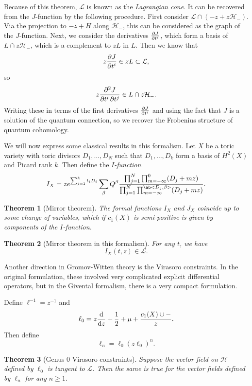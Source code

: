 \documentclass[leqno, openany]{memoir}
\newtheorem{thm}{Theorem}[section]
\theoremstyle{definition}
\theoremstyle{remark}
\theoremstyle{plain}
\theoremstyle{definition}
\theoremstyle{remark}
\newcommand{\mc}[1]{\mathcal{#1}}
\begin{document}
Because of this theorem, $\mc{L}$ is known as the \textit{Lagrangian cone}. It can be recovered from the $J$-function by the following procedure. First consider $\mc{L} \cap (-z + z \mc{H}_-)$. Via the projection to $-z + H$ along $\mc{H}_-$, this can be considered as the graph of the $J$-function. Next, we consider the derivatives $\pdv{J}{t^i}$, which form a basis of $L \cap z \mc{H}_-$, which is a complement to $zL$ in $L$. Then we know that
\[ z \pdv{J}{t^i} \in z L \subset \mc{L}, \]
so 
\[ z \pdv{J}{t^i,t^j} \in L \cap z \mc{H}_-. \]
Writing these in terms of the first derivatives $\pdv{J}{t^i}$ and using the fact that $J$ is a solution of the quantum connection, so we recover the Frobenius structure of quantum cohomology.

We will now express some classical results in this formalism. Let $X$ be a toric variety with toric divisors $D_1, \ldots, D_N$ such that $D_1, \ldots, D_k$ form a basis of $H^2(X)$ and Picard rank $k$. Then define the \textit{$I$-function}
\[ I_X = z e^{\sum_{j=1}^k t_i D_i} \sum_{\beta} Q^{\beta} \frac{\prod_{j=1}^N \prod_{m=-\infty}^0 (D_j+mz)}{\prod_{j=1}^N \prod_{m=-\infty}^{\ab<D_j, \beta>}(D_j + mz)}. \]

\begin{thm}[Mirror theorem]
    The formal functions $I_X$ and $J_X$ coincide up to some change of variables, which if $c_1(X)$ is semi-positive is given by components of the $I$-function.
\end{thm}


\begin{thm}[Mirror theorem in this formalism]
    For any $t$, we have
    \[ I_X(t, z) \in \mc{L}. \]
\end{thm}

Another direction in Gromov-Witten theory is the Virasoro constraints. In the original formulation, these involved very complicated explicit differential operators, but in the Givental formalism, there is a very compact formulation.

Define $\ell^{-1} = z^{-1}$ and
\[ \ell_0 = z \odv{}{z} + \frac{1}{2} + \mu + \frac{c_1(X) \cup -}{z}. \]
Then define 
\[ \ell_n = \ell_0 (z \ell_0)^n. \]

\begin{thm}[Genus-$0$ Virasoro constraints]
    Suppose the vector field on $\mc{H}$ defined by $\ell_0$ is tangent to $\mc{L}$. Then the same is true for the vector fields defined by $\ell_n$ for any $n \geq 1$.
\end{thm}
\end{document}
